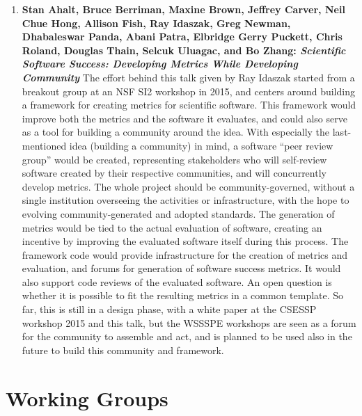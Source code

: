 \documentclass[11pt, oneside]{amsart}
\newcommand{\todo}[1]{{\color{blue}$\blacksquare$~\textsf{[TODO: #1]}}}
\begin{document}
\begin{enumerate}
\item \textbf{Stan Ahalt, Bruce Berriman, Maxine Brown, Jeffrey Carver, Neil
Chue Hong, Allison Fish, Ray Idaszak, Greg Newman, Dhabaleswar Panda, Abani
Patra, Elbridge Gerry Puckett, Chris Roland, Douglas Thain, Selcuk Uluagac, and
Bo Zhang: \textit{Scientific Software Success: Developing Metrics While
Developing Community}} The effort behind this talk given by Ray Idaszak started
from a breakout group at an NSF SI2 workshop in 2015, and centers around
building a framework for creating metrics for scientific software. This
framework would improve both the metrics and the software it evaluates, and
could also serve as a tool for building a community around the idea. With
especially the last-mentioned idea (building a community) in mind, a software
``peer review group'' would be created, representing stakeholders who will
self-review software created by their respective communities, and will
concurrently develop metrics. The whole project should be community-governed,
without a single institution overseeing the activities or infrastructure, with
the hope to evolving community-generated and adopted standards. The generation
of metrics would be tied to the actual evaluation of software, creating an
incentive by improving the evaluated software itself during this process. The
framework code would provide infrastructure for the creation of metrics and
evaluation, and forums for generation of software success metrics. It would also
support code reviews of the evaluated software. An open question is whether it
is possible to fit the resulting metrics in a common template. So far, this is
still in a design phase, with a white paper at the CSESSP workshop 2015 and this
talk, but the WSSSPE workshops are seen as a forum for the community to assemble
and act, and is planned to be used also in the future to build this community
and framework.

\end{enumerate}

\section{Working Groups} \label{sec:WGs}

\end{document}
